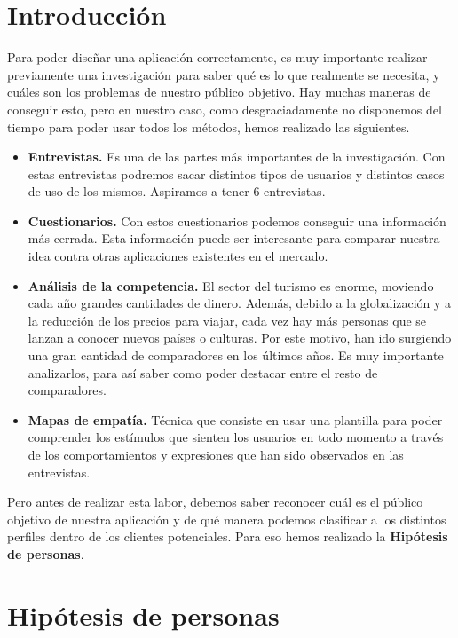 
\section{Introducción}

Para poder diseñar una aplicación correctamente, es muy importante realizar previamente una investigación para saber qué
es lo que realmente se necesita, y cuáles son los problemas de nuestro público objetivo. Hay muchas maneras de conseguir esto, pero en nuestro
caso, como desgraciadamente no disponemos del tiempo para poder usar todos los métodos, hemos realizado las siguientes.

\begin{itemize}
    \item \textbf{Entrevistas.} Es una de las partes más importantes de la investigación. Con estas entrevistas podremos sacar distintos tipos de usuarios y distintos casos de uso de los mismos. Aspiramos a tener 6 entrevistas.
    \item \textbf{Cuestionarios.} Con estos cuestionarios podemos conseguir una información más cerrada. Esta información puede ser interesante para comparar nuestra idea contra otras aplicaciones existentes en el mercado.
    \item \textbf{Análisis de la competencia.} El sector del turismo es enorme, moviendo cada año grandes cantidades de dinero. Además, debido a la 
    globalización y a la reducción de los precios para viajar, cada vez hay más personas que se lanzan a conocer nuevos países o culturas. Por este 
    motivo, han ido surgiendo una gran cantidad de comparadores en los últimos años. Es muy importante analizarlos, para así saber como poder destacar 
    entre el resto de comparadores.
    \item \textbf{Mapas de empatía.} Técnica que consiste en usar una plantilla para poder comprender los estímulos que sienten los usuarios en todo
    momento a través de los comportamientos y expresiones que han sido observados en las entrevistas.
\end{itemize}



Pero antes de realizar esta labor, debemos saber reconocer cuál es el público objetivo de nuestra aplicación y
de qué manera podemos clasificar a los distintos perfiles dentro de los clientes potenciales. Para eso hemos realizado la
\textbf{Hipótesis de personas}.

\section{Hipótesis de personas}

